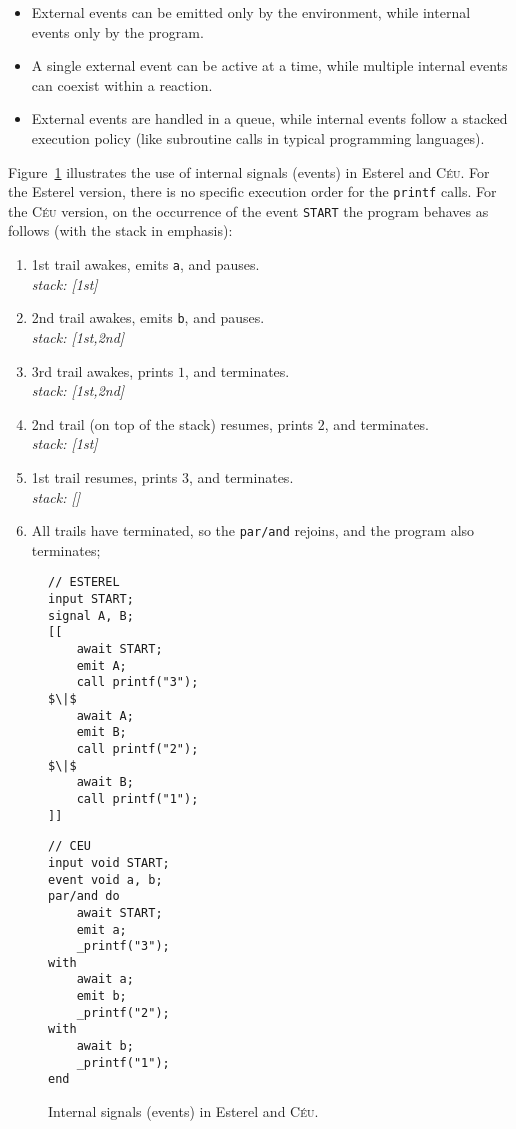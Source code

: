 \documentclass{acm_proc_article-sp}
\newcommand{\CEU}{\textsc{C\'{e}u}\xspace}
\newcommand{\code}[1] {{\small{\texttt{#1}}}}
\newcommand{\1}{\;}
\newcommand{\2}{\;\;}
\newcommand{\3}{\;\;\;}
\newcommand{\5}{\;\;\;\;\;}
\begin{document}
\begin{itemize}
\item External events can be emitted only by the environment, while internal 
events only by the program.
\item A single external event can be active at a time, while multiple internal 
events can coexist within a reaction.
\item External events are handled in a queue, while internal events follow a 
stacked execution policy (like subroutine calls in typical programming 
languages).
\end{itemize}

Figure~\ref{lst.prints} illustrates the use of internal signals (events) in 
Esterel and \CEU.
%
For the Esterel version, there is no specific execution order for the 
\code{printf} calls.
%
For the \CEU version, on the occurrence of the event \code{START} the program 
behaves as follows (with the stack in emphasis):
%
{\small
\begin{enumerate}
\setlength{\itemsep}{0pt}
\item 1st trail awakes, emits \code{a}, and pauses.\\
    \emph{stack: [1st]}
\item 2nd trail awakes, emits \code{b}, and pauses.\\
    \emph{stack: [1st,2nd]}
\item 3rd trail awakes, prints $1$, and terminates.\\
    \emph{stack: [1st,2nd]}
\item 2nd trail (on top of the stack) resumes, prints $2$, and terminates.\\
    \emph{stack: [1st]}
\item 1st trail resumes, prints $3$, and terminates.\\
    \emph{stack: []}
\item All trails have terminated, so the \code{par/and} rejoins, and the 
program also terminates;
\end{enumerate}
}

\begin{figure}[!t]
\begin{minipage}[t]{0.50\linewidth}
\begin{lstlisting}[mathescape=true]
// ESTEREL
input START;
signal A, B;
[[
    await START;
    emit A;
    call printf("3");
$\|$
    await A;
    emit B;
    call printf("2");
$\|$
    await B;
    call printf("1");
]]
\end{lstlisting}
\end{minipage}
%
\begin{minipage}[t]{0.45\linewidth}
\begin{lstlisting}
// CEU
input void START;
event void a, b;
par/and do
    await START;
    emit a;
    _printf("3");
with
    await a;
    emit b;
    _printf("2");
with
    await b;
    _printf("1");
end
\end{lstlisting}
\end{minipage}
\caption{ Internal signals (events) in Esterel and \CEU. \newline
\label{lst.prints}
}
\end{figure}
\end{document}
